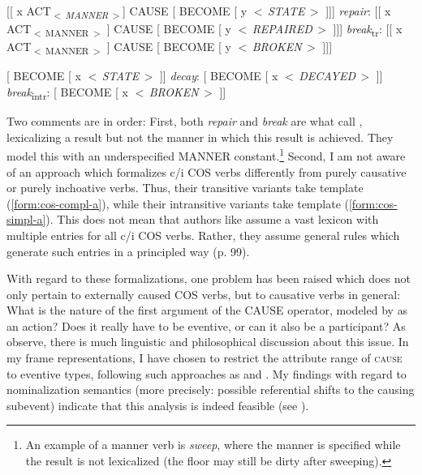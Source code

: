 \begin{small}
  \begin{exe}
    \ex \label{form:cos-compl} 
    \begin{xlist}
      \ex \label{form:cos-compl-a} [[ x ACT\textsubscript{$<\,$\textit{MANNER}$\,>$}] CAUSE [ BECOME [ y $<\,$\textit{STATE}$\,>$ ]]]  
      \ex \label{form:cos-compl-b} \textit{repair}: [[ x ACT\textsubscript{$<\,$MANNER$\,>$} ] CAUSE [ BECOME [ y \textit{$<\,$REPAIRED$\,>$} ]]]  
      \ex \label{form:cos-compl-c} \textit{break}\textsubscript{tr}: [[ x ACT\textsubscript{$<\,$MANNER$\,>$} ] CAUSE [ BECOME [ y \textit{$<\,$BROKEN$\,>$} ]]]
    \end{xlist} 
  \end{exe}
  \begin{exe} 
    \ex \label{form:cos-simpl} 
    \begin{xlist}
      \ex \label{form:cos-simpl-a} [ BECOME [ x $<\,$\textit{STATE}$\,>$ ]] 
      \ex \label{form:cos-simpl-b} \textit{decay}: [ BECOME [ x \textit{$<\,$DECAYED$\,>$} ]] 
      \ex \label{form:cos-simpl-c} \textit{break}\textsubscript{intr}: [ BECOME [ x \textit{$<\,$BROKEN$\,>$} ]]
    \end{xlist}
  \end{exe}
\end{small}

\noindent Two comments are in order: First, both \textit{repair} and \textit{break} are what \citet{RappaportHovav.1998} call , lexicalizing a result but not the manner in which this result is achieved. They model this with an underspecified MANNER constant.\footnote{An example of a manner verb is \textit{sweep}, where the manner is specified while the result is not lexicalized (the floor may still be dirty after sweeping).} 
Second, I am not aware of an approach which formalizes c/i COS verbs differently from purely causative or purely inchoative verbs. Thus, their transitive variants take template (\ref{form:cos-compl-a}), while their intransitive variants take template (\ref{form:cos-simpl-a}). This does not mean that authors like \citet[]{RappaportHovav.1998} assume a vast lexicon with multiple entries for all c/i COS verbs. Rather, they assume general rules which generate such entries in a principled way (p. 99).

With regard to these formalizations, one problem has been raised which does not only pertain to externally caused COS verbs, but to causative verbs in general: What is the nature of the first argument of the CAUSE operator, modeled by \citet[]{RappaportHovav.1998} as an action? Does it really have to be eventive, or can it also be a participant? As \citet[107]{VanValinJr.1997} observe, there is much linguistic and philosophical discussion about this issue. 
In my frame representations, I have chosen to restrict the attribute range of \textsc{cause} to eventive types, following such approaches as \citet[]{RappaportHovav.1998} and \citet[]{VanValinJr.1997}. My findings with regard to nominalization semantics (more precisely: possible referential shifts to the causing subevent) indicate that this analysis is indeed feasible (see ).

